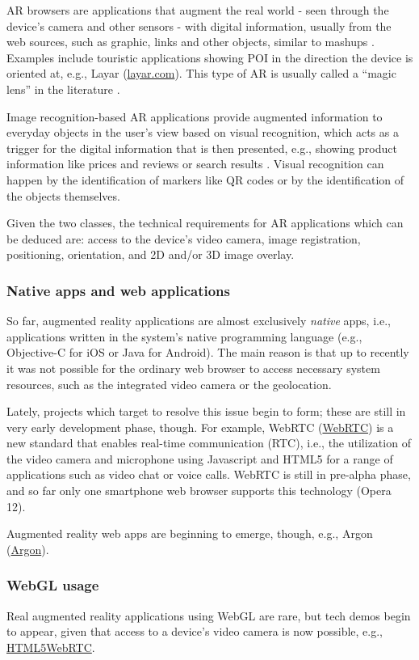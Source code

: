 \documentclass[12pt,journal,compsoc]{IEEEtran}
\begin{document}
AR browsers are applications that augment the real world - seen through the device's camera and other sensors - with digital information, usually from the web sources, such as graphic, links and other objects, similar to mashups \cite{Schmalstieg2011}.  Examples include touristic applications showing POI in the direction the device is oriented at, e.g., Layar (\url{layar.com}). This type of AR is usually called a “magic lens” in the literature \cite{Olsson2011a}. 

Image recognition-based AR applications provide augmented information to everyday objects in the user's view based on visual recognition, which acts as a trigger for the digital information that is then presented, e.g., showing product information like prices and reviews \cite{ShopSavvy} or search results \cite{GoogleGoggles}. Visual recognition can happen by the identification of markers like QR codes or by the identification of the objects themselves.

Given the two classes, the technical requirements for AR applications which can be deduced are: access to the device’s video camera, image registration, positioning, orientation, and 2D and/or 3D image overlay.


\subsubsection{Native apps and web applications}
So far, augmented reality applications are almost exclusively \textit{native} apps, i.e., applications written in the system’s native programming language (e.g., Objective-C for iOS or Java for Android). The main reason is that up to recently it was not possible for the ordinary web browser to access necessary system resources, such as the integrated video camera or the geolocation.

\label{WebRTC} Lately, projects which target to resolve this issue begin to form; these are still in very early development phase, though. For example, WebRTC (\url{WebRTC}) is a new  standard that enables real-time communication (RTC), i.e., the utilization of the video camera and microphone using Javascript and HTML5 for a range of applications such as video chat or voice calls. WebRTC is still in pre-alpha phase, and so far only one smartphone web browser supports this technology (Opera 12).

Augmented reality web apps are beginning to emerge, though, e.g., Argon (\url{Argon}).

\subsubsection{WebGL usage}
Real augmented reality applications using WebGL are rare, but tech demos begin to appear, given that access to a device’s video camera is now possible, e.g., \url{ HTML5WebRTC}.
\end{document}
